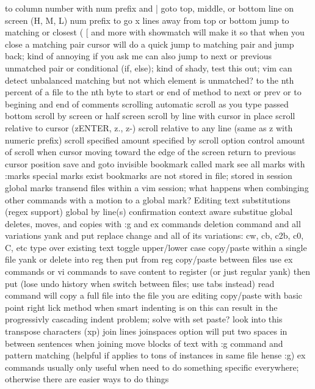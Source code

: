 \documentclass[12pt]{book}
\begin{document}
    to column number with num prefix and |
    goto top, middle, or bottom line on screen (H, M, L) num prefix to go x lines away from top or bottom
    jump to matching or closest ( { [ and more with %
      showmatch will make it so that when you close a matching pair cursor will do a quick jump to matching pair and jump back; kind of annoying if you ask me
      can also jump to next or previous unmatched pair or conditional (if, else); kind of shady, test this out; vim can detect unbalanced matching but not which element is unmatched?
    to the nth percent of a file
    to the nth byte
    to start or end of method
    to next or prev { or }
    to begining and end of comments
  scrolling
    automatic scroll as you type passed bottom
    scroll by screen or half screen
    scroll by line with cursor in place
    scroll relative to cursor (zENTER, z., z-)
    scroll relative to any line (same as z with numeric prefix)
    scroll specified amount specified by scroll option
    control amount of scroll when cursor moving toward the edge of the screen
  return to previous cursor position
  save and goto invisible bookmark  called mark
    see all marks with :marks
    special marks exist
    bookmarks are not stored in file; stored in session
    global marks transend files within a vim session; what happens when combinging other commands with a motion to a global mark?
Editing text
  substitutions (regex support)
    global
    by line(s)
    confirmation
    context aware substitue
  global deletes, moves, and copies with :g and ex commands
  deletion command and all variations
  yank and put
  replace
    change and all of its variations: cw, cb, c2b, c0, C, etc
    type over existing text
  toggle upper/lower case
  copy/paste within a single file
    yank or delete into reg then put from reg
  copy/paste between files
    use ex commands or vi commands to save content to register (or just regular yank) then put (lose undo history when switch between files; use tabs instead)
    read command will copy a full file into the file you are editing
  copy/paste with basic point right lick method
    when smart indenting is on this can result in the progressivly cascading indent problem; solve with set paste?  look into this
  transpose characters (xp)
  join lines
    joinspaces option will put two spaces in between sentences when joining
  move blocks of text
    with :g command and pattern matching (helpful if applies to tons of instances in same file hense :g)
  ex commands
    usually only useful when need to do something specific everywhere; otherwise there are easier ways to do things
}
\end{document}

